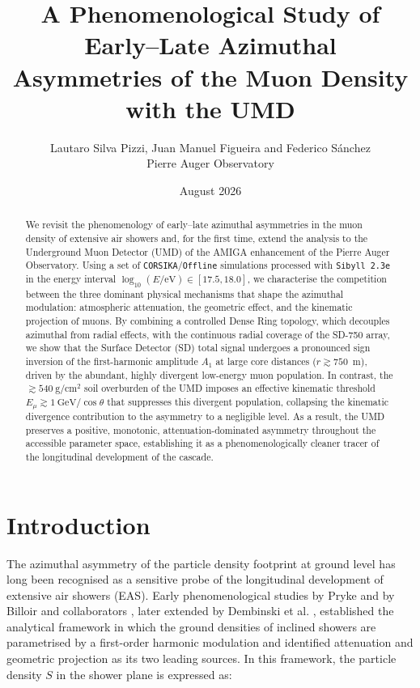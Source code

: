 \documentclass[11pt,a4paper]{article}
\title{A Phenomenological Study of Early--Late Azimuthal Asymmetries of the Muon Density with the UMD}
\author{Lautaro Silva Pizzi, Juan Manuel Figueira and Federico S\'anchez \\ Pierre Auger Observatory}
\date{August 2026}
\begin{document}
\maketitle

\begin{abstract}
We revisit the phenomenology of early--late azimuthal asymmetries in the muon density of extensive air showers and, for the first time, extend the analysis to the Underground Muon Detector (UMD) of the AMIGA enhancement of the Pierre Auger Observatory. Using a set of \texttt{CORSIKA}/\texttt{Offline} simulations processed with \texttt{Sibyll\,2.3e} in the energy interval $\log_{10}(E/\mathrm{eV})\in[17.5,18.0]$, we characterise the competition between the three dominant physical mechanisms that shape the azimuthal modulation: atmospheric attenuation, the geometric effect, and the kinematic projection of muons. By combining a controlled Dense Ring topology, which decouples azimuthal from radial effects, with the continuous radial coverage of the SD-750 array, we show that the Surface Detector (SD) total signal undergoes a pronounced sign inversion of the first-harmonic amplitude $A_1$ at large core distances ($r\gtrsim 750$~m), driven by the abundant, highly divergent low-energy muon population. In contrast, the $\gtrsim 540~\mathrm{g/cm^2}$ soil overburden of the UMD imposes an effective kinematic threshold $E_\mu\gtrsim 1~\mathrm{GeV}/\cos\theta$ that suppresses this divergent population, collapsing the kinematic divergence contribution to the asymmetry to a negligible level. As a result, the UMD preserves a positive, monotonic, attenuation-dominated asymmetry throughout the accessible parameter space, establishing it as a phenomenologically cleaner tracer of the longitudinal development of the cascade.
\end{abstract}

\section{Introduction}
\label{sec:intro}

The azimuthal asymmetry of the particle density footprint at ground level has long been recognised as a sensitive probe of the longitudinal development of extensive air showers (EAS). Early phenomenological studies by Pryke \cite{Pryke1998} and by Billoir and collaborators \cite{Billoir2002, GAP2000_017}, later extended by Dembinski et al. \cite{GAP2007_124}, established the analytical framework in which the ground densities of inclined showers are parametrised by a first-order harmonic modulation and identified attenuation and geometric projection as its two leading sources. In this framework, the particle density $S$ in the shower plane is expressed as:
\end{document}
